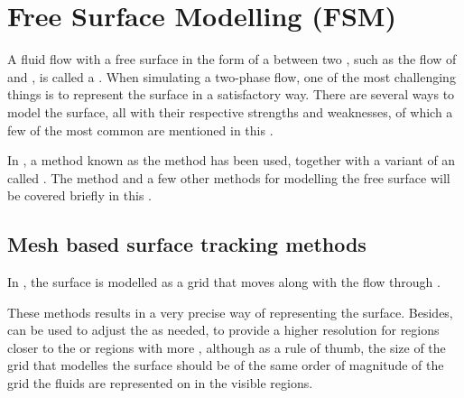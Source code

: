 \chapter{Free Surface Modelling (FSM)}

A fluid flow with a free surface in the form of a  between two , such as the flow of \water and \air, is called a . When simulating a two-phase flow, one of the most challenging things is to represent the surface in a satisfactory way. There are several ways to model the surface, all with their respective strengths and weaknesses, of which a few of the most common are mentioned in this \levelname.

In \thisprojectwork, a method known as the \VOF method has been used, together with a variant of an  called . The \VOF method and a few other methods for modelling the free surface will be covered briefly in this \levelname.



\section{Mesh based surface tracking methods}

In , the surface is modelled as a grid that moves along with the flow through .

These methods results in a very precise way of representing the surface. Besides,  can be used to adjust the  as needed, to provide a higher resolution for regions closer to the \camera or regions with more \turbulence, although as a rule of thumb, the size of the grid that modelles the surface should be of the same order of magnitude of the grid the fluids are represented on in the visible regions.

